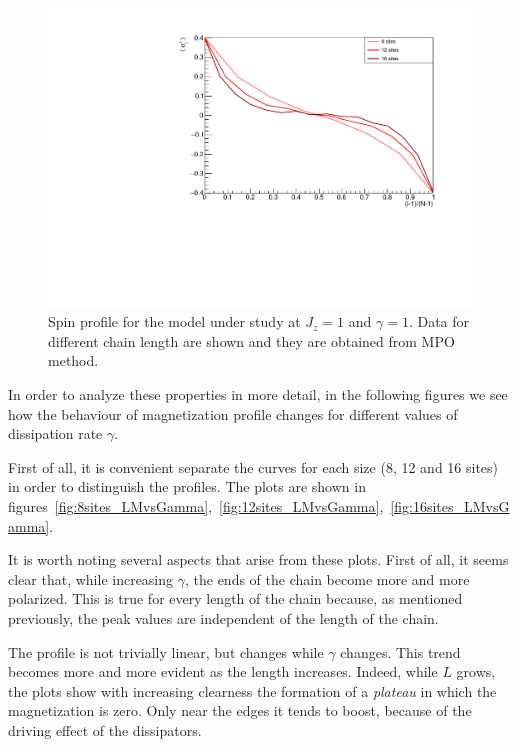 \begin{figure}[H]
    \centering
    \includegraphics[scale=0.7]{Figures/NORM_LM_comparisonVSsize.pdf}
    \captionsetup{width=1.\linewidth}
    \caption{Spin profile for the model under study at $J_z = 1$ and $\gamma=1$. Data for different chain length are shown and they are obtained from MPO method.}
    \label{fig:LM_comparisonVSsizeJz1Gamma1}
\end{figure}

In order to analyze these properties in more detail, in the following figures we see how the behaviour of magnetization profile changes for different values of dissipation rate $\gamma$. 

First of all, it is convenient separate the curves for each size (8, 12 and 16 sites) in order to distinguish the profiles. The plots are shown in figures~\ref{fig:8sites_LMvsGamma},~\ref{fig:12sites_LMvsGamma},~\ref{fig:16sites_LMvsGamma}.

It is worth noting several aspects that arise from these plots. First of all, it seems clear that, while increasing $\gamma$, the ends of the chain become more and more polarized. This is true for every length of the chain because, as mentioned previously, the peak values are independent of the length of the chain.

The profile is not trivially linear, but changes while $\gamma$ changes. This trend becomes more and more evident as the length increases. Indeed, while $L$ grows, the plots show with increasing clearness the formation of a \emph{plateau} in which the magnetization is zero. Only near the edges it tends to boost, because of the driving effect of the dissipators.


